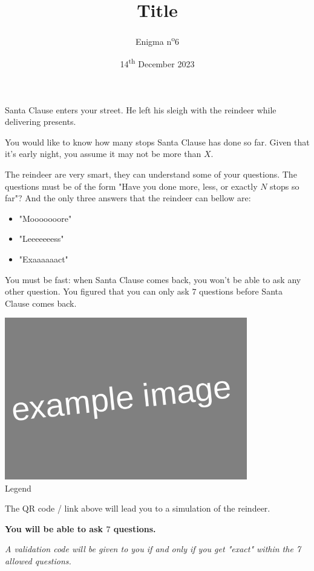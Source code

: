\documentclass[a4paper, top=10mm]{article}
\title{\textbf{\huge{Title}}}
\author{Enigma n\textsuperscript{o}6}
\date{14\textsuperscript{th} December 2023}
\begin{document}
	\maketitle
	
	Santa Clause enters your street.
	He left his sleigh with the reindeer while delivering presents.
	
	You would like to know how many stops Santa Clause has done so far.
	Given that it's early night, you assume it may not be more than $X$.
	
	The reindeer are very smart, they can understand some of your questions.
	The questions must be of the form "Have you done more, less, or exactly $N$ stops so far"?
	And the only three answers that the reindeer can bellow are:
	\begin{itemize}
		\item "Mooooooore"
		\item "Leeeeeeess"
		\item "Exaaaaaact"
	\end{itemize}
	You must be fast: when Santa Clause comes back, you won't be able to ask any other question.
	You figured that you can only ask $7$ questions before Santa Clause comes back.
	
	\begin{center}
		\includegraphics[height=200pt]{00example.png}\\
		Legend
	\end{center}
	
	The QR code / link above will lead you to a simulation of the reindeer.
	
	\textbf{You will be able to ask $7$ questions.}
	
	\textit{A validation code will be given to you if and only if you get "exact" within the 7 allowed questions.}
	
\end{document}
